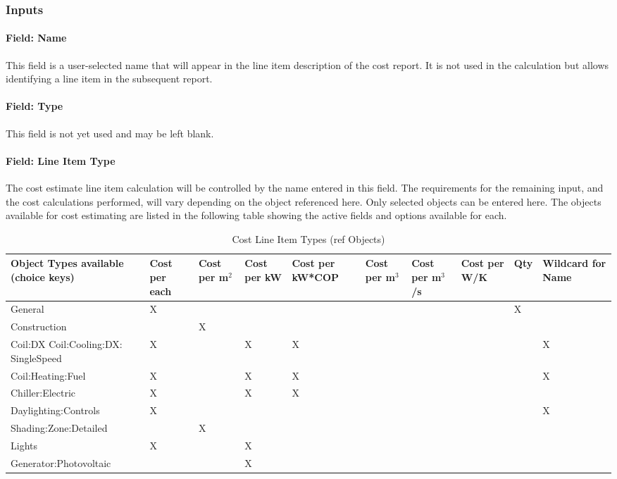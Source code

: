 \subsubsection{Inputs}\label{inputs}

\paragraph{Field: Name}\label{componentcostlineitem-field-name}

This field is a user-selected name that will appear in the line item description of the cost report. It is not used in the calculation but allows identifying a line item in the subsequent report.

\paragraph{Field: Type}\label{field-type}

This field is not yet used and may be left blank.

\paragraph{Field: Line Item Type}\label{field-line-item-type}

The cost estimate line item calculation will be controlled by the name entered in this field. The requirements for the remaining input, and the cost calculations performed, will vary depending on the object referenced here. Only selected objects can be entered here. The objects available for cost estimating are listed in the following table showing the active fields and options available for each.

\begin{longtable}[c]{p{1.4in}p{0.4in}p{0.4in}p{0.5in}p{0.5in}p{0.4in}p{0.4in}p{0.4in}p{0.4in}p{0.5in}}
\caption{Cost Line Item Types (ref Objects) \label{table:cost-line-item-types-ref-objects}} \tabularnewline
\toprule
Object Types available (choice keys) & Cost per each & Cost per m\(^{2}\) & Cost per kW & Cost per kW*COP & Cost per m\(^{3}\) & Cost per m\(^{3}\)/s & Cost per W/K & Qty & Wildcard for Name \tabularnewline
\midrule
\endhead

General & X & ~ & ~ & ~ & ~ & ~ & ~ & X & ~ \tabularnewline
\hline
Construction & ~ & X & ~ & ~ & ~ & ~ & ~ & ~ & ~ \tabularnewline
\hline
Coil:DX Coil:Cooling:DX: SingleSpeed & X & ~ & X & X & ~ & ~ & ~ & ~ & X \tabularnewline
\hline
Coil:Heating:Fuel & X & ~ & X & X & ~ & ~ & ~ & ~ & X \tabularnewline
\hline
Chiller:Electric & X & ~ & X & X & ~ & ~ & ~ & ~ & ~ \tabularnewline
\hline
Daylighting:Controls & X & ~ & ~ & ~ & ~ & ~ & ~ & ~ & X \tabularnewline
\hline
Shading:Zone:Detailed & ~ & X & ~ & ~ & ~ & ~ & ~ & ~ & ~ \tabularnewline
\hline
Lights & X & ~ & X & ~ & ~ & ~ & ~ & ~ & ~ \tabularnewline
\hline
Generator:Photovoltaic & ~ & ~ & X & ~ & ~ & ~ & ~ & ~ & ~ \tabularnewline
\bottomrule
\end{longtable}

